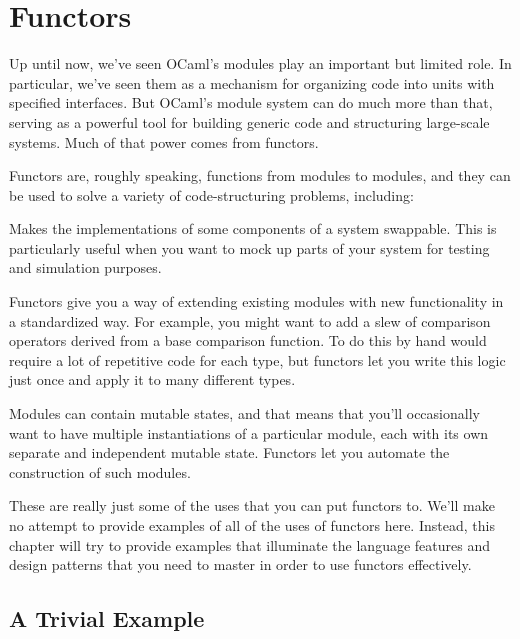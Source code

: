 \hypertarget{functors}{%
\section{Functors}\label{functors}}

Up until now, we've seen OCaml's modules play an important but limited
role. In particular, we've seen them as a mechanism for organizing code
into units with specified interfaces. But OCaml's module system can do
much more than that, serving as a powerful tool for building generic
code and structuring large-scale systems. Much of that power comes from
functors. 

Functors are, roughly speaking, functions from modules to modules, and
they can be used to solve a variety of code-structuring problems,
including:

\begin{description}
\tightlist
\item[Dependency injection]
Makes the implementations of some components of a system swappable. This
is particularly useful when you want to mock up parts of your system for
testing and simulation purposes.
\item[Autoextension of modules]
Functors give you a way of extending existing modules with new
functionality in a standardized way. For example, you might want to add
a slew of comparison operators derived from a base comparison function.
To do this by hand would require a lot of repetitive code for each type,
but functors let you write this logic just once and apply it to many
different types.
\item[Instantiating modules with state]
Modules can contain mutable states, and that means that you'll
occasionally want to have multiple instantiations of a particular
module, each with its own separate and independent mutable state.
Functors let you automate the construction of such modules.
\end{description}

These are really just some of the uses that you can put functors to.
We'll make no attempt to provide examples of all of the uses of functors
here. Instead, this chapter will try to provide examples that illuminate
the language features and design patterns that you need to master in
order to use functors effectively.

\hypertarget{a-trivial-example}{%
\subsection{A Trivial Example}\label{a-trivial-example}}

